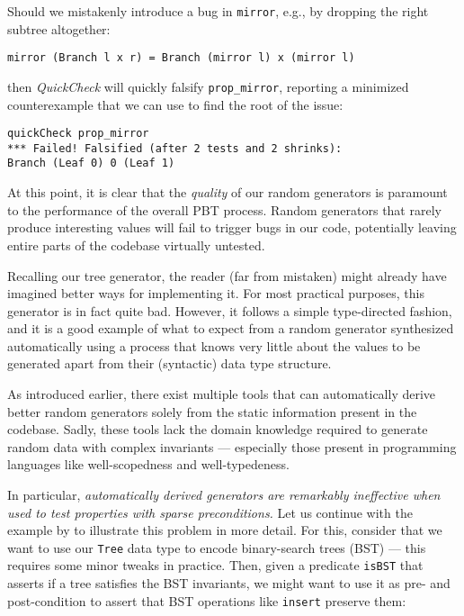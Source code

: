 \documentclass[acmsmall, anonymous]{acmart}
\newcommand{\quickcheck}{\textit{QuickCheck}\xspace}
\begin{document}
\noindent Should we mistakenly introduce a bug in \texttt{mirror}, e.g., by
dropping the right subtree altogether:

\begin{verbatim}
mirror (Branch l x r) = Branch (mirror l) x (mirror l)
\end{verbatim}

\noindent then \quickcheck will quickly falsify \texttt{prop\_mirror}, reporting
a minimized counterexample that we can use to find the root of the issue:

\begin{verbatim}
quickCheck prop_mirror
*** Failed! Falsified (after 2 tests and 2 shrinks):
Branch (Leaf 0) 0 (Leaf 1)
\end{verbatim}

At this point, it is clear that the \emph{quality} of our random generators is
paramount to the performance of the overall PBT process.
%
Random generators that rarely produce interesting values will fail to trigger
bugs in our code, potentially leaving entire parts of the codebase virtually
untested.


Recalling our tree generator, the reader (far from mistaken) might already have
imagined better ways for implementing it.
%
For most practical purposes, this generator is in fact quite bad.
%
However, it follows a simple type-directed fashion, and it is a good example of
what to expect from a random generator synthesized automatically using a process
that knows very little about the values to be generated apart from their
(syntactic) data type structure.

As introduced earlier, there exist multiple tools that can automatically derive
better random generators solely from the static information present in the
codebase.
%
%
Sadly, these tools lack the domain knowledge required to generate random data
with complex invariants --- especially those present in programming languages
like well-scopedness and well-typedeness.


In particular, \emph{automatically derived generators are remarkably ineffective
  when used to test properties with sparse preconditions.}
%
Let us continue with the example by \citeauthor{lampropoulos2019coverage} to
illustrate this problem in more detail.
%
For this, consider that we want to use our \texttt{Tree} data type to encode
binary-search trees (BST) --- this requires some minor tweaks in practice.
%
Then, given a predicate \texttt{isBST} that asserts if a tree satisfies the BST
invariants, we might want to use it as pre- and post-condition to assert that
BST operations like \texttt{insert} preserve them:
\end{document}
